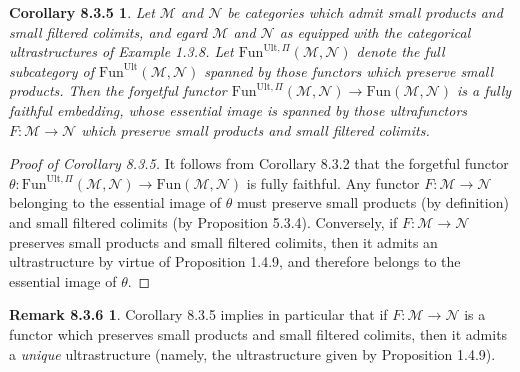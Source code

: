 \documentclass[11pt]{article}
\newcommand{\Ult}{\mathrm{Ult}}
\newcommand{\Fun}{\mathrm{Fun}}
\theoremstyle{plain}
\newtheorem*{corollaryM}{Corollary 8.3.5}
\theoremstyle{definition}
\newtheorem*{remarkM}{Remark 8.3.6}
\begin{document}

\begin{corollaryM}
Let $\mathcal{M}$ and $\mathcal{N}$ be categories which admit small products and small
filtered colimits, and egard $\mathcal{M}$ and $\mathcal{N}$ as equipped with the categorical
ultrastructures of Example 1.3.8. %
Let $\Fun^{\Ult,\Pi}(\mathcal{M},\mathcal{N})$ denote the full subcategory of
$\Fun^{\Ult}(\mathcal{M},\mathcal{N})$ spanned by those functors which preserve small products.
Then the forgetful functor $\Fun^{\Ult,\Pi}(\mathcal{M},\mathcal{N}) \to \Fun(\mathcal{M},\mathcal{N})$
is a fully faithful embedding, whose essential image is spanned by those ultrafunctors
$F : \mathcal{M} \to \mathcal{N}$ which preserve small products and small filtered colimits.
\end{corollaryM}

\begin{proof}[Proof of Corollary 8.3.5]
It follows from Corollary 8.3.2 that the forgetful functor
$\theta : \Fun^{\Ult,\Pi}(\mathcal{M},\mathcal{N}) \to \Fun(\mathcal{M},\mathcal{N})$
is fully faithful. Any functor $F : \mathcal{M} \to \mathcal{N}$ belonging to the essential image
of $\theta$ must preserve small products (by definition) and small filtered colimits
(by Proposition 5.3.4). Conversely, if $F : \mathcal{M} \to \mathcal{N}$ preserves small products
and small filtered colimits, then it admits an ultrastructure by virtue of Proposition 1.4.9,
and therefore belongs to the essential image of $\theta$.
\end{proof}


\begin{remarkM}
Corollary 8.3.5 implies in particular that if $F : \mathcal{M} \to \mathcal{N}$ is a functor
which preserves small products and small filtered colimits, then it admits a \textit{unique}
ultrastructure (namely, the ultrastructure given by Proposition 1.4.9).
\end{remarkM}
\end{document}
